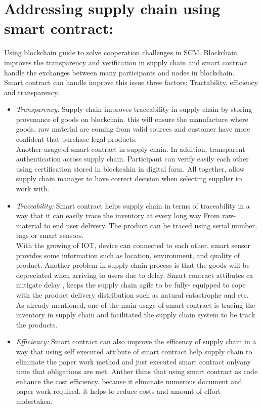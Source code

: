 \section{Addressing supply chain using smart contract: }
Using blockchain guide to solve cooperation challenges in SCM. Blockchain improves the transparency and verification in supply chain and smart contract handle the exchanges between many participants and nodes in blockchain.\\
Smart contract can handle improve this issue three factors: Tractability, efficiency and transparency. \\
\begin{itemize}
	\item \textit{Transparency:} Supply chain improves traceability in supply chain by storing provenance of goods on blockchain. this will ensure the manufacture where goods, raw material are coming from valid sources and customer have more confident that purchase legal products.\\ 
	Another usage of smart contract in supply chain. In addition, transparent authentication across supply chain. Participant can verify easily each other using certification stored in blockcahin in digital form. All together, allow supply chain manager to have correct decision when selecting supplier to work with.\\
	\item \textit{Traceability:} Smart contract helps supply chain in terms of traceability in a way that it can easily trace the inventory at every long way From raw-material to end user delivery. The product can be traced using serial number, tags or smart sensors.\\
	With the growing of IOT, device can connected to each other. smart sensor provides some information such as location, environment, and quality of product. Another problem in supply chain process is that the goods will be depreciated when arriving to users due to delay. Smart contract attibutes ca mitigate delay , keeps the supply chain agile to be fully- equipped to cope with the product delivery distribution such as natural catastrophe and etc.\\
	As already mentioned, one of the main usage of smart contract is tracing the inventory in supply chain and facilitated the supply chain system to be track the products.\\
	 \item \textit{Efficiency:}  Smart contract can also improve the efficency of supply chain in a way that using self executed attibute of smart contract help supply chain to eliminate the paper work method and just executed smart contract onlyany time that obligations are met. Anther thins that using smart contract as code enhance the cost efficiency. because it eliminate numerous document and paper work required. it helps to reduce costs and amount of effort undertaken\cite{Angwei}.\\ 
\end{itemize}


